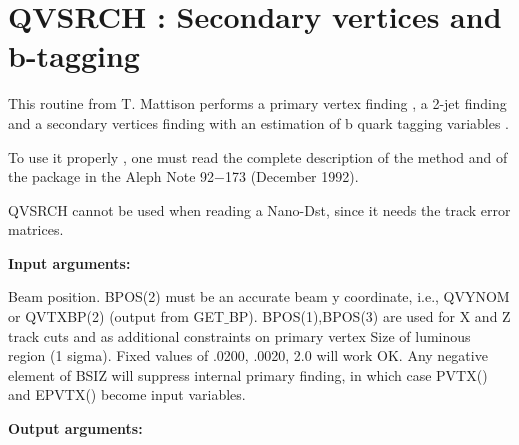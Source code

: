 \section{\label{sec-OARVSRC}QVSRCH : Secondary vertices and b-tagging}
\par
{}
\par
This routine from T. Mattison performs a primary vertex finding , a 2-jet finding
and a secondary vertices finding with an estimation of b quark tagging variables .
\par
To use it properly , one must read the complete description of the method and of the
package in the Aleph Note 92$-$173 (December 1992).
\par
 QVSRCH cannot be used when reading a Nano-Dst, since it needs the track error matrices.
\par
{\bf Input arguments:}
\begin{indentlist}{ 3.50cm}{ 3.75cm}
Beam position.
      BPOS(2) must be an accurate beam y coordinate,
      i.e., QVYNOM or QVTXBP(2)  (output from GET$\_$BP).
      BPOS(1),BPOS(3) are used for X and Z track cuts
       and as additional constraints on primary vertex
Size of luminous region (1 sigma).
      Fixed values of .0200, .0020, 2.0 will work OK.
      Any negative element of BSIZ will suppress internal primary finding,
      in which case PVTX() and EPVTX() become input variables.
\end{indentlist}
\par
{\bf Output arguments:}
